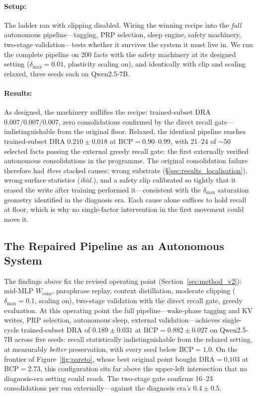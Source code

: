 \paragraph{Setup:} The ladder ran with clipping disabled. Wiring the winning recipe into the \emph{full} autonomous pipeline---tagging, PRP selection, sleep engine, safety machinery, two-stage validation---tests whether it survives the system it must live in. We run the complete pipeline on 200 facts with the safety machinery at its designed setting ($\delta_{\max}=0.01$, plasticity scaling on), and identically with clip and scaling relaxed, three seeds each on Qwen2.5-7B.

\paragraph{Results:} As designed, the machinery nullifies the recipe: trained-subset DRA $0.007/0.007/0.007$, zero consolidations confirmed by the direct recall gate---indistinguishable from the original floor. Relaxed, the identical pipeline reaches trained-subset DRA $\mathbf{0.210 \pm 0.018}$ at $\mathrm{BCP}=0.90$--$0.99$, with 21--24 of $\sim$50 selected facts passing the external greedy recall gate: the first externally verified autonomous consolidations in the programme. The original consolidation failure therefore had \emph{three} stacked causes: wrong substrate (\S\ref{sec:results_localisation}), wrong surface statistics (\emph{ibid.}), and a safety clip calibrated so tightly that it erased the write after training performed it---consistent with the $\delta_{\max}$ saturation geometry identified in the diagnosis era. Each cause alone suffices to hold recall at floor, which is why no single-factor intervention in the first movement could move it.

\subsection{The Repaired Pipeline as an Autonomous System}
\label{sec:results_pipeline_v2}

The findings above fix the revised operating point (Section~\ref{sec:method_v2}): mid-MLP $W_{\mathrm{cons}}$, paraphrase replay, context distillation, moderate clipping ($\delta_{\max}=0.1$, scaling on), two-stage validation with the direct recall gate, greedy evaluation. At this operating point the full pipeline---wake-phase tagging and KV writes, PRP selection, autonomous sleep, external validation---achieves single-cycle trained-subset DRA of $0.189 \pm 0.031$ at $\mathrm{BCP}=0.882 \pm 0.027$ on Qwen2.5-7B across five seeds: recall statistically indistinguishable from the relaxed setting, at measurably \emph{better} preservation, with every seed below $\mathrm{BCP}=1.0$. On the frontier of Figure~\ref{fig:pareto}, whose best original point bought $\mathrm{DRA}=0.103$ at $\mathrm{BCP}=2.73$, this configuration sits far above the upper-left intersection that no diagnosis-era setting could reach. The two-stage gate confirms 16--23 consolidations per run externally---against the diagnosis era's $0.4 \pm 0.5$.

